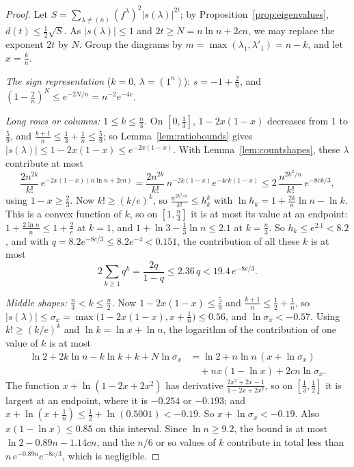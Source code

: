 \begin{proof}
Let $S=\sum_{\lambda\ne(n)}(f^\lambda)^2|s(\lambda)|^{2t}$; by Proposition~\ref{prop:eigenvalues}, $d(t)\le\frac12\sqrt S$. As $|s(\lambda)|\le1$ and $2t\ge N=n\ln n+2cn$, we may replace the exponent $2t$ by $N$. Group the diagrams by $m=\max(\lambda_1,\lambda'_1)=n-k$, and let $x=\frac kn$.

\emph{The sign representation} ($k=0$, $\lambda=(1^n)$): $s=-1+\frac2n$, and $(1-\frac2n)^N\le e^{-2N/n}=n^{-2}e^{-4c}$.

\emph{Long rows or columns: $1\le k\le\frac n3$.} On $[0,\frac13]$, $1-2x(1-x)$ decreases from $1$ to $\frac59$, and $\frac{k+1}n\le\frac13+\frac1n\le\frac59$; so Lemma~\ref{lem:ratiobounds} gives $|s(\lambda)|\le1-2x(1-x)\le e^{-2x(1-x)}$. With Lemma~\ref{lem:countshapes}, these $\lambda$ contribute at most
\[
\frac{2n^{2k}}{k!}\,e^{-2x(1-x)(n\ln n+2cn)}=\frac{2n^{2k}}{k!}\,n^{-2k(1-x)}e^{-4ck(1-x)}\le2\,\frac{n^{2k^2/n}}{k!}\,e^{-8ck/3},
\]
using $1-x\ge\frac23$. Now $k!\ge(k/e)^k$, so $\frac{n^{2k^2/n}}{k!}\le h_k^k$ with $\ln h_k=1+\frac{2k}n\ln n-\ln k$. This is a convex function of $k$, so on $[1,\frac n3]$ it is at most its value at an endpoint: $1+\frac{2\ln n}n\le1+\frac2e$ at $k=1$, and
$1+\ln3-\frac13\ln n\le2.1$ at $k=\frac n3$. So $h_k\le e^{2.1}<8.2$, and with $q=8.2e^{-8c/3}\le8.2e^{-4}<0.151$, the contribution of all these $k$ is at most
\[
2\sum_{k\ge1}q^k=\frac{2q}{1-q}\le2.36\,q<19.4\,e^{-8c/3}.
\]

\emph{Middle shapes: $\frac n3<k\le\frac n2$.} Now $1-2x(1-x)\le\frac59$ and $\frac{k+1}n\le\frac12+\frac1n$, so $|s(\lambda)|\le\sigma_x=\max\bigl(1-2x(1-x),x+\frac1n\bigr)\le0.56$, and $\ln\sigma_x<-0.57$. Using $k!\ge(k/e)^k$ and $\ln k=\ln x+\ln n$, the logarithm of the
contribution of one value of $k$ is at most
\[
\begin{aligned}\ln2+2k\ln n-k\ln k+k+N\ln\sigma_x&=\ln2+n\ln n\,(x+\ln\sigma_x)\\&\quad+nx(1-\ln x)+2cn\ln\sigma_x.\end{aligned}
\]
The function $x+\ln(1-2x+2x^2)$ has derivative $\frac{2x^2+2x-1}{1-2x+2x^2}$, so on $[\frac13,\frac12]$ it is largest at an endpoint, where it is $-0.254$ or $-0.193$; and $x+\ln(x+\frac1n)\le\frac12+\ln(0.5001)<-0.19$. So $x+\ln\sigma_x<-0.19$. Also
$x(1-\ln x)\le0.85$ on this interval. Since $\ln n\ge9.2$, the bound is at most $\ln2-0.89n-1.14cn$, and the $n/6$ or so values of $k$ contribute in total less than $n\,e^{-0.89n}e^{-8c/3}$, which is negligible.


\end{proof}
